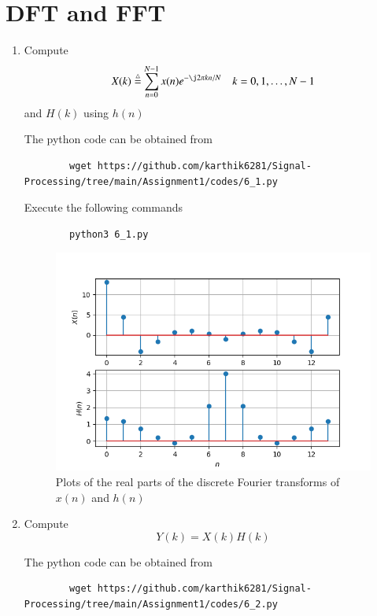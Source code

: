 \documentclass[journal,12pt,twocolumn]{IEEEtran}
\renewcommand\thesection{\arabic{section}}
\begin{document}
\section{DFT and FFT}
\begin{enumerate}[label=\thesection.\arabic*]
	\item Compute
	\begin{equation}
		X(k) \define \sum _{n=0}^{N-1}x(n) e^{-\j2\pi kn/N} \quad k = 0,1,\dots, N-1
	\end{equation}
	and $H(k)$ using $h(n)$
	
	\solution The python code can be obtained from 
	\begin{lstlisting}
		wget https://github.com/karthik6281/Signal-Processing/tree/main/Assignment1/codes/6_1.py
	\end{lstlisting}
	
	Execute the following commands
	\begin{lstlisting}
		python3 6_1.py
	\end{lstlisting}
	
	\begin{figure}[!ht]
		\centering
		\includegraphics[width=\columnwidth]{./figs/6_1.png}
		\caption{Plots of the real parts of the discrete Fourier transforms of $x(n)$ and $h(n)$}
		\label{fig-6.1}	
	\end{figure}
	
	\item Compute 
	\begin{equation}
		Y(k) = X(k)H(k)
	\end{equation}
	
	\solution The python code can be obtained from 
	\begin{lstlisting}
		wget https://github.com/karthik6281/Signal-Processing/tree/main/Assignment1/codes/6_2.py
	\end{lstlisting}
	

\end{enumerate}
\end{document}

